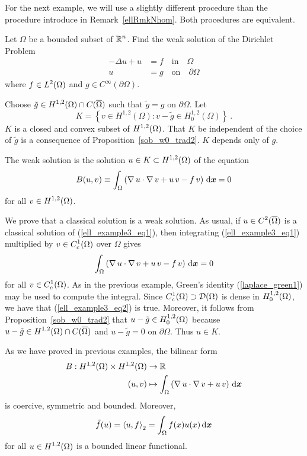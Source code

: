 For the next example, we will use a slightly different procedure than
the procedure introduce in Remark~\ref{ellRmkNhom}.  Both procedures
are equivalent.

\begin{egg}
Let $\Omega$ be a bounded subset of $\displaystyle \mathbb{R}^n$.  Find the
weak solution of the Dirichlet Problem
\begin{equation} \label{ell_example3_eq1}
\begin{split}
-\Delta u + u &= f \quad \text{in} \quad \Omega \\
u&= g \quad \text{on} \quad \partial \Omega
\end{split}
\end{equation}
where $\displaystyle f \in L^2(\Omega)$ and $g\in C^\infty(\partial \Omega)$.  

Choose
$\displaystyle \tilde{g} \in H^{1,2}(\Omega) \cap C(\overline{\Omega})$
such that
$\tilde{g}=g$ on $\partial \Omega$.  Let
\[
K = \left\{ v \in H^{1,2}(\Omega) : v - \tilde{g} \in H^{1,2}_0(\Omega)
\right\} \ .
\]
$K$ is a closed and convex subset of $\displaystyle H^{1,2}(\Omega)$.
That $K$ be independent of the choice of $\tilde{g}$ is a consequence of
Proposition~\ref{sob_w0_trad2}.  $K$ depends only of $g$.

The weak solution is the solution
$\displaystyle u\in K \subset H^{1,2}(\Omega)$ of the equation
\begin{equation} \label{ell_example3_eq2}
B(u,v) \equiv \int_\Omega \left( \operatorname{\nabla} u \cdot \operatorname{\nabla} v
+ u\, v - f\, v \right) \,\mathrm{d}{{\bm{x}}} = 0
\end{equation}
for all $\displaystyle v \in H^{1,2}(\Omega)$.

We prove that a classical solution is a weak solution.  As usual,
if $\displaystyle u\in C^2(\overline{\Omega})$ is a classical solution of
(\ref{ell_example3_eq1}), then integrating (\ref{ell_example3_eq1})
multiplied by $\displaystyle v \in C^1_c(\Omega)$ over $\Omega$ gives
\[
\int_\Omega \left( \operatorname{\nabla} u \cdot \operatorname{\nabla} v
+ u\, v - f\, v \right) \,\mathrm{d}{{\bm{x}}} = 0
\]
for all $\displaystyle v \in C^1_c(\Omega)$.
As in the previous example, Green's identity (\ref{laplace_green1})
may be used to compute the integral.  Since
$\displaystyle C^1_c(\Omega) \supset \mathcal{D}(\Omega)$ is dense in
$\displaystyle H^{1,2}_0(\Omega)$, we have that
(\ref{ell_example3_eq2}) is true.  Moreover, it follows from 
Proposition~\ref{sob_w0_trad2} that
$\displaystyle u- \tilde{g} \in H^{1,2}_0(\Omega)$ because
$\displaystyle u - \tilde{g} \in H^{1,2}(\Omega)\cap C(\overline{\Omega})$ and
$u - \tilde{g}=0$ on $\partial \Omega$.  Thus $u\in K$.

As we have proved in previous examples, the bilinear form
\begin{align*}
B:H^{1,2}(\Omega)\times H^{1,2}(\Omega) &\rightarrow \mathbb{R} \\
(u,v) &\mapsto \int_\Omega \left( \operatorname{\nabla} u \cdot \operatorname{\nabla} v
+ u\, v \right) \,\mathrm{d}{{\bm{x}}}
\end{align*}
is coercive, symmetric and bounded.  Moreover,
\[
\tilde{f}(u) = \left\langle{u} , {f}\right\rangle_2 = \int_\Omega f(x)u(x)\,\mathrm{d}{{\bm{x}}}
\]
for all $\displaystyle u \in H^{1,2}(\Omega)$
is a bounded linear functional.


\end{egg}
